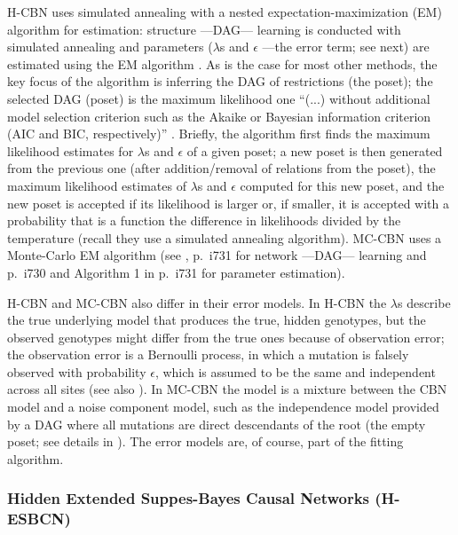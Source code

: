 \documentclass[a4paper,11pt]{article}
\begin{document}
H-CBN uses simulated annealing with a nested expectation-maximization (EM) algorithm for estimation: structure ---DAG--- learning is conducted with simulated annealing and parameters ($\lambda$s and $\epsilon$ ---the error term; see next) are estimated using the EM algorithm \citep[section 2.3, pp.~2810--2811 of][]{gerstung2009quantifying}. As is the case for most other methods, the key focus of the algorithm is inferring the DAG of restrictions (the poset); the selected DAG (poset) is the maximum likelihood one ``(...) without additional model selection criterion such as the Akaike or Bayesian information criterion (AIC and BIC, respectively)'' \citep[p.~2811]{gerstung2009quantifying}. Briefly, the algorithm first finds the maximum likelihood estimates for $\lambda$s and $\epsilon$ of a given poset; a new poset is then generated from the previous one (after addition/removal of relations from the poset), the maximum likelihood estimates of $\lambda$s and $\epsilon$ computed for this new poset, and the new poset is accepted if its likelihood is larger or, if smaller, it is accepted with a probability that is a function the difference in likelihoods divided by the temperature (recall they use a simulated annealing algorithm). MC-CBN uses a Monte-Carlo EM algorithm (see \citealp{montazeri2016large}, p.~i731 for network ---DAG--- learning and p.~i730 and Algorithm 1 in p.~i731 for parameter estimation).

H-CBN and MC-CBN also differ in their error models. In H-CBN the $\lambda$s describe the true underlying model that produces the true, hidden genotypes, but the observed genotypes might differ from the true ones because of observation error; the observation error is a Bernoulli process, in which a mutation is falsely observed with probability $\epsilon$,   which is assumed to be the same and independent across all sites (see also \citealp[p.~2319]{Sakoparnig2012}). In MC-CBN the model is a mixture between the CBN model and a noise component model, such as the independence model provided by a DAG where all mutations are direct descendants of the root (the empty poset; see details in \citealp[p.~i731]{montazeri2016large}). The error models are, of course, part of the fitting algorithm.




\subsubsection{Hidden Extended Suppes-Bayes Causal Networks (H-ESBCN)} \label{hesbcndetails}
\end{document}
